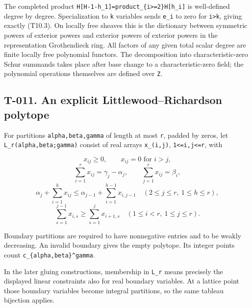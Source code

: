 \documentclass[
  10pt,
]{article}
\begin{document}
The completed product
\texttt{\small H[\allowbreak{}H-\allowbreak{}1-\allowbreak{}h\_\allowbreak{}1]\allowbreak{}=\allowbreak{}product\_\allowbreak{}\{i>=\allowbreak{}2\}H[\allowbreak{}h\_\allowbreak{}i]\allowbreak{}}
is well-defined degree by degree. Specialization to \texttt{\small k}
variables sends \texttt{\small e\_\allowbreak{}i} to zero for
\texttt{\small i>k}, giving exactly (T10.3). On locally free sheaves
this is the dictionary between symmetric powers of exterior powers and
exterior powers of exterior powers in the representation Grothendieck
ring. All factors of any given total scalar degree are finite locally
free polynomial functors. The decomposition into characteristic-zero
Schur summands takes place after base change to a characteristic-zero
field; the polynomial operations themselves are defined over
\texttt{\small Z}.

\subsection{T-011. An explicit Littlewood--Richardson
polytope}\label{t-011.-an-explicit-littlewoodrichardson-polytope}

For partitions
\texttt{\small alpha,\allowbreak{}beta,\allowbreak{}gamma} of length at
most \texttt{\small r}, padded by zeros, let
\texttt{\small L\_\allowbreak{}r(\allowbreak{}alpha,\allowbreak{}beta;\allowbreak{}gamma)\allowbreak{}}
consist of real arrays
\texttt{\small x\_\allowbreak{}(\allowbreak{}i,\allowbreak{}j)\allowbreak{}},
\texttt{\small 1<=\allowbreak{}i,\allowbreak{}j<=\allowbreak{}r}, with

\[
x_{ij}\ge0,\qquad x_{ij}=0\text{ for }i>j,
\tag{T11.1}
\] \[
\sum_{i=1}^r x_{ij}=\gamma_j-\alpha_j,
\qquad \sum_{j=1}^r x_{ij}=\beta_i,
\tag{T11.2}
\] \[
\alpha_j+\sum_{i=1}^{h}x_{ij}
\le\alpha_{j-1}+\sum_{i=1}^{h-1}x_{i,j-1}
\quad(2\le j\le r,\ 1\le h\le r),
\tag{T11.3}
\] \[
\sum_{s=1}^{j-1}x_{i,s}\ge\sum_{s=1}^{j}x_{i+1,s}
\quad(1\le i<r,\ 1\le j\le r).
\tag{T11.4}
\]

Boundary partitions are required to have nonnegative entries and to be
weakly decreasing. An invalid boundary gives the empty polytope. Its
integer points count
\texttt{\small c\_\allowbreak{}\{alpha,\allowbreak{}beta\}\textasciicircum{}gamma}.

In the later gluing constructions, membership in
\texttt{\small L\_\allowbreak{}r} means precisely the displayed linear
constraints also for real boundary variables. At a lattice point those
boundary variables become integral partitions, so the same tableau
bijection applies.
\end{document}
